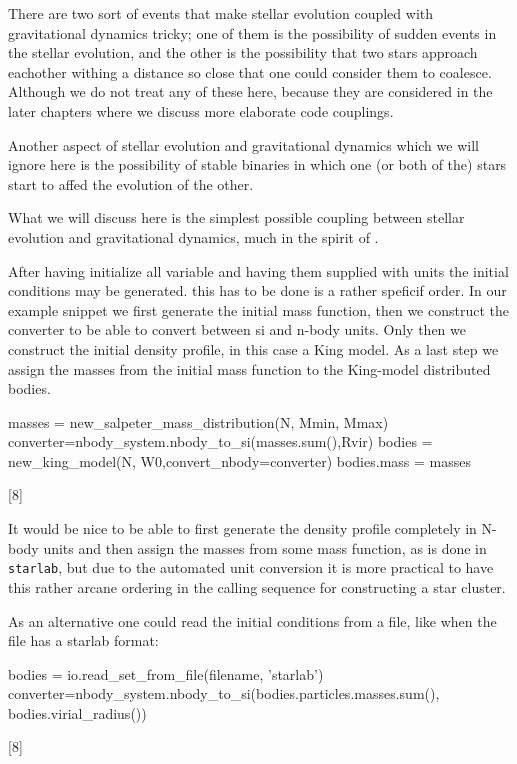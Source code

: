 There are two sort of events that make stellar evolution coupled with
gravitational dynamics tricky; one of them is the possibility of
sudden events in the stellar evolution, and the other is the
possibility that two stars approach eachother withing a distance so
close that one could consider them to coalesce. Although we do not
treat any of these here, because they are considered in the later
chapters where we discuss more elaborate code couplings.

Another aspect of stellar evolution and gravitational dynamics which
we will ignore here is the possibility of stable binaries in which one
(or both of the) stars start to affed the evolution of the other. 

What we will discuss here is the simplest possible coupling between
stellar evolution and gravitational dynamics, much in the spirit of
\cite{MNRAS.224..193T.193T}.


After having initialize all variable and having them supplied with
units the initial conditions may be generated.  this has to be done is
a rather speficif order.  In our example snippet we first generate the
initial mass function, then we construct the converter to be able to
convert between si and n-body units.  Only then we construct the
initial density profile, in this case a King model.  As a last step we
assign the masses from the initial mass function to the King-model
distributed bodies. 
\begin{verbatimtab}[8]
    masses = new_salpeter_mass_distribution(N, Mmin, Mmax)
    converter=nbody_system.nbody_to_si(masses.sum(),Rvir)
    bodies = new_king_model(N, W0,convert_nbody=converter)
    bodies.mass = masses
\end{verbatimtab}[8]

It would be nice to be able to first generate the density profile
completely in N-body units and then assign the masses from some mass
function, as is done in {\tt starlab}, but due to the automated unit
conversion it is more practical to have this rather arcane ordering in
the calling sequence for constructing a star cluster. 

As an alternative one could read the initial conditions from a file, like when the file has a starlab format:
\begin{verbatimtab}[8]
    bodies = io.read_set_from_file(filename, 'starlab') 
    converter=nbody_system.nbody_to_si(bodies.particles.masses.sum(),
                                      bodies.virial_radius())
\end{verbatimtab}[8]

